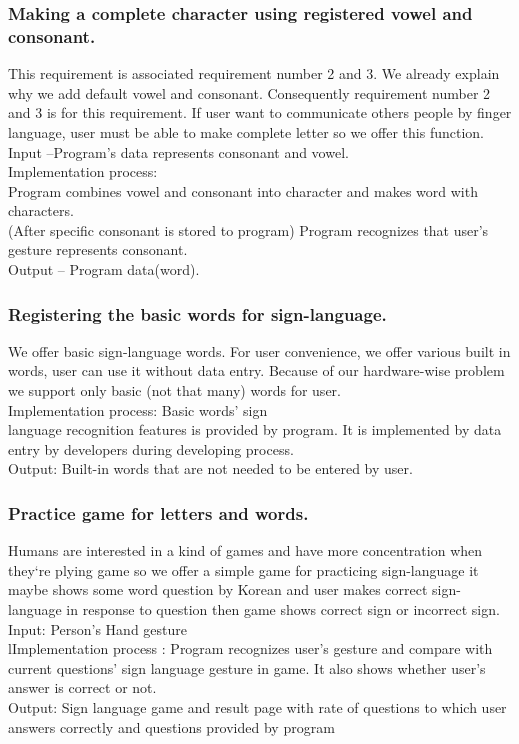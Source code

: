 \documentclass[10pt,journal,compsoc]{IEEEtran}
\begin{document}
\subsubsection{Making a complete character using registered vowel and consonant.}

This requirement is associated requirement number 2 and 3. We already explain why we add default vowel and consonant. Consequently requirement number 2 and 3 is for this requirement. If user want to communicate others people by finger language, user must be able to make complete letter so we offer this function.
\\Input –Program's data represents consonant and vowel.
\\Implementation process:
\\Program combines vowel and consonant into character and makes word with characters.
\\(After specific consonant is stored to program) Program recognizes that user’s gesture represents consonant.
\\Output – Program data(word).

\subsubsection{Registering the basic words for sign-language.}

We offer basic sign-language words. For user convenience, we offer various built in words, user can use it without data entry. Because of our hardware-wise problem we support only basic (not that many) words for user.
\\Implementation process:  Basic words’ sign 
\\language recognition features is provided by program. It is implemented by data entry by developers during developing process.
\\Output: Built-in words that are not needed to be entered by user.

\subsubsection{Practice game for letters and words.}

Humans are interested in a kind of games and have more concentration when they`re plying game so we offer a simple game for practicing sign-language it maybe shows some word question by Korean and user makes correct sign-language in response to question then game shows correct sign or incorrect sign.
\\Input: Person's Hand gesture
\\lImplementation process : Program recognizes user’s gesture and compare with current questions’ sign language gesture in game. It also shows whether user’s answer is correct or not.
\\Output: Sign language game and result page with rate of questions to which user answers correctly and questions provided by program
\end{document}
